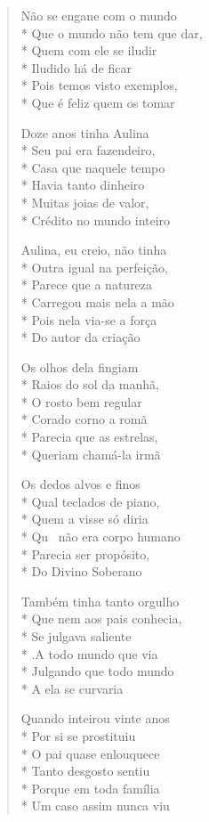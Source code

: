 \begin{verse}

Não se engane com o mundo\\*
Que o mundo não tem que dar,\\*
Quem com ele se iludir\\*
Iludido há de ficar\\*
Pois temos visto exemplos,\\*
Que é feliz quem os tomar

Doze anos tinha Aulina\\*
Seu pai era fazendeiro,\\*
Casa que naquele tempo\\*
Havia tanto dinheiro\\*
Muitas joias de valor,\\*
Crédito no mundo inteiro

Aulina, eu creio, não tinha\\*
Outra igual na perfeição,\\*
Parece que a natureza\\*
Carregou mais nela a mão\\*
Pois nela via-se a força\\*
Do autor da criação

Os olhos dela fingiam\\*
Raios do sol da manhã,\\*
O rosto bem regular\\*
Corado corno a romã\\*
Parecia que as estrelas,\\*
Queriam chamá-la irmã

Os dedos alvos e finos\\*
Qual teclados de piano,\\*
Quem a visse só diria\\*
Qu~ não era corpo humano\\*
Parecia ser propósito,\\*
Do Divino Soberano

Também tinha tanto orgulho\\*
Que nem aos pais conhecia,\\*
Se julgava saliente\\*
.A todo mundo que via\\*
Julgando que todo mundo\\*
A ela se curvaria

Quando inteirou vinte anos\\*
Por si se prostituiu\\*
O pai quase enlouquece\\*
Tanto desgosto sentiu\\*
Porque em toda família\\*
Um caso assim nunca viu


\end{verse}
